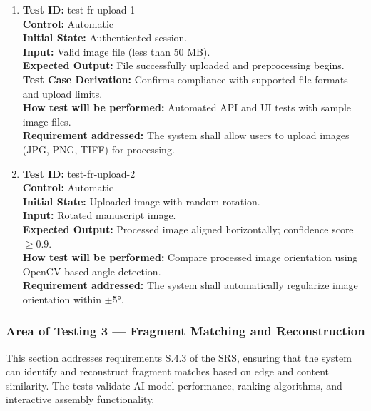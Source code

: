 \documentclass[12pt, titlepage]{article}
\begin{document}
\begin{enumerate}
\item
\textbf{Test ID:} test-fr-upload-1\\
\textbf{Control:} Automatic\\
\textbf{Initial State:} Authenticated session.\\
\textbf{Input:} Valid image file (less than 50 MB).\\
\textbf{Expected Output:} File successfully uploaded and preprocessing begins.\\
\textbf{Test Case Derivation:} Confirms compliance with supported file formats and upload limits.\\
\textbf{How test will be performed:} Automated API and UI tests with sample image files.\\
\textbf{Requirement addressed:} The system shall allow users to upload images (JPG, PNG, TIFF) for processing.\\

\item 
\textbf{Test ID:} test-fr-upload-2\\
\textbf{Control:} Automatic\\
\textbf{Initial State:} Uploaded image with random rotation.\\
\textbf{Input:} Rotated manuscript image.\\
\textbf{Expected Output:} Processed image aligned horizontally; confidence score $\geq 0.9$.\\
\textbf{How test will be performed:} Compare processed image orientation using OpenCV-based angle detection.\\
\textbf{Requirement addressed:} The system shall automatically regularize image orientation within $\pm$5°.\\
\end{enumerate}

\subsubsection{Area of Testing 3 — Fragment Matching and Reconstruction}

This section addresses requirements S.4.3 of the SRS, ensuring that the system can identify and reconstruct fragment matches based on edge and content similarity. The tests validate AI model performance, ranking algorithms, and interactive assembly functionality.
\end{document}
